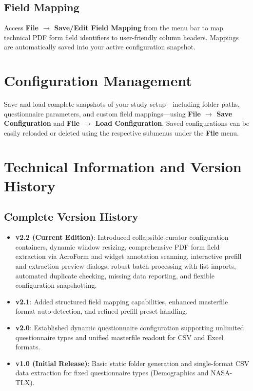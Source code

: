 \documentclass[11pt,a4paper]{article}
\begin{document}
\subsection{Field Mapping}
Access \textbf{File $\rightarrow$ Save/Edit Field Mapping} from the menu bar to map technical PDF form field identifiers to user-friendly column headers. Mappings are automatically saved into your active configuration snapshot.

\section{Configuration Management}

Save and load complete snapshots of your study setup—including folder paths, questionnaire parameters, and custom field mappings—using \textbf{File $\rightarrow$ Save Configuration} and \textbf{File $\rightarrow$ Load Configuration}. Saved configurations can be easily reloaded or deleted using the respective submenus under the \textbf{File} menu.

\section{Technical Information and Version History}

\subsection{Complete Version History}
\begin{itemize}
    \item \textbf{v2.2 (Current Edition)}: Introduced collapsible curator configuration containers, dynamic window resizing, comprehensive PDF form field extraction via AcroForm and widget annotation scanning, interactive prefill and extraction preview dialogs, robust batch processing with list imports, automated duplicate checking, missing data reporting, and flexible configuration snapshotting.
    \item \textbf{v2.1}: Added structured field mapping capabilities, enhanced masterfile format auto-detection, and refined prefill preset handling.
    \item \textbf{v2.0}: Established dynamic questionnaire configuration supporting unlimited questionnaire types and unified masterfile readout for CSV and Excel formats.
    \item \textbf{v1.0 (Initial Release)}: Basic static folder generation and single-format CSV data extraction for fixed questionnaire types (Demographics and NASA-TLX).
\end{itemize}
\end{document}
